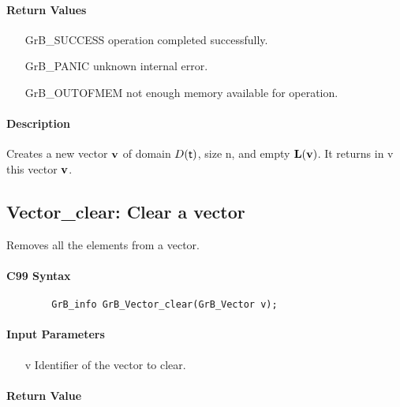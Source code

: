 \paragraph{Return Values}

\begin{itemize}[leftmargin=2.1in]
\item[{\sf GrB\_SUCCESS}]    operation completed successfully. \\
\item[{\sf GrB\_PANIC}]      unknown internal error. \\
\item[{\sf GrB\_OUTOFMEM}]   not enough memory available for operation. \\
\end{itemize}

\paragraph{Description}

Creates a new vector ${\bf v}$ of domain $D({\sf t})$, size {\sf n}, and
empty $\bold{L}({\bf v})$. It returns in {\sf v} this vector ${\bf v}$.

\subsection{{\sf Vector\_clear}: Clear a vector}

Removes all the elements from a vector.

\paragraph{C99 Syntax}

\begin{verbatim}
        GrB_info GrB_Vector_clear(GrB_Vector v);
\end{verbatim}

\paragraph{Input Parameters}

\begin{itemize}[leftmargin=1.1in]
    \item[{\sf v}] Identifier of the vector to clear.
\end{itemize}

\paragraph{Return Value}

